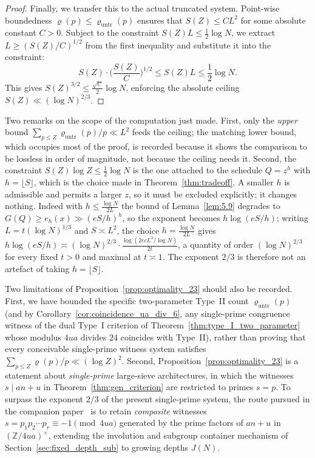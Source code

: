 \documentclass[11pt, a4paper]{article}
\theoremstyle{plain}
\theoremstyle{definition}
\newcommand{\Z}{\mathbb{Z}}
\begin{document}
\begin{proof}
Finally, we transfer this to the actual truncated system. Point-wise boundedness $\varrho(p) \le \varrho_{\mathrm{untr}}(p)$ ensures that $S(Z) \le C L^2$ for some absolute constant $C > 0$. Subject to the constraint $S(Z) L \le \frac12\log N$, we extract $L \ge (S(Z)/C)^{1/2}$ from the first inequality and substitute it into the constraint:
$$S(Z) \cdot \Big(\frac{S(Z)}{C}\Big)^{1/2} \le S(Z) L \le \frac{1}{2} \log N.$$
This gives $S(Z)^{3/2} \le \frac{\sqrt{C}}{2} \log N$, enforcing the absolute ceiling $S(Z) \ll (\log N)^{2/3}$.
\end{proof}

Two remarks on the scope of the computation just made. First, only the \emph{upper} bound $\sum_{p\le Z}\varrho_{\mathrm{untr}}(p)/p\ll L^{2}$ feeds the ceiling; the matching lower bound, which occupies most of the proof, is recorded because it shows the comparison to be lossless in order of magnitude, not because the ceiling needs it. Second, the constraint $S(Z)\log Z\le\frac12\log N$ is the one attached to the schedule $Q=z^{h}$ with $h=\lfloor S\rfloor$, which is the choice made in Theorem~\ref{thm:tradeoff}. A smaller $h$ is admissible and permits a larger $z$, so it must be excluded explicitly; it changes nothing. Indeed with $h\le\frac{\log N}{2L}$ the bound of Lemma~\ref{lem:5.9} degrades to $G(Q)\ge e_h(x)\gg(eS/h)^{h}$, so the exponent becomes $h\log(eS/h)$; writing $L=t(\log N)^{1/3}$ and $S\asymp L^{2}$, the choice $h=\frac{\log N}{2L}$ gives $h\log(eS/h)\asymp(\log N)^{2/3}\cdot\frac{\log(2ecL^{3}/\log N)}{2t}$, a quantity of order $(\log N)^{2/3}$ for every fixed $t>0$ and maximal at $t\asymp1$. The exponent $2/3$ is therefore not an artefact of taking $h=\lfloor S\rfloor$.

Two limitations of Proposition~\ref{prop:optimality_23} should also be recorded. First, we have bounded the specific two-parameter Type~II count $\varrho_{\mathrm{untr}}(p)$ (and by Corollary~\ref{cor:coincidence_ua_div_6}, any single-prime congruence witness of the dual Type~I criterion of Theorem~\ref{thm:type_I_two_parameter} whose modulus $4ua$ divides $24$ coincides with Type~II), rather than proving that every conceivable single-prime witness system satisfies $\sum_{p\le Z}\varrho(p)/p\ll(\log Z)^{2}$. Second, Proposition~\ref{prop:optimality_23} is a statement about \emph{single-prime} large-sieve architectures, in which the witnesses $s\mid an+u$ in Theorem~\ref{thm:gen_criterion} are restricted to primes $s=p$. To surpass the exponent $2/3$ of the present single-prime system, the route pursued in the companion paper~\cite{dahan2026b} is to retain \emph{composite} witnesses $s=p_1 p_2\cdots p_r\equiv-1\pmod{4ua}$ generated by the prime factors of $an+u$ in $(\Z/4ua)^{\times}$, extending the involution and subgroup container mechanism of Section~\ref{sec:fixed_depth_sub} to growing depths $J(N)$.
\end{document}
